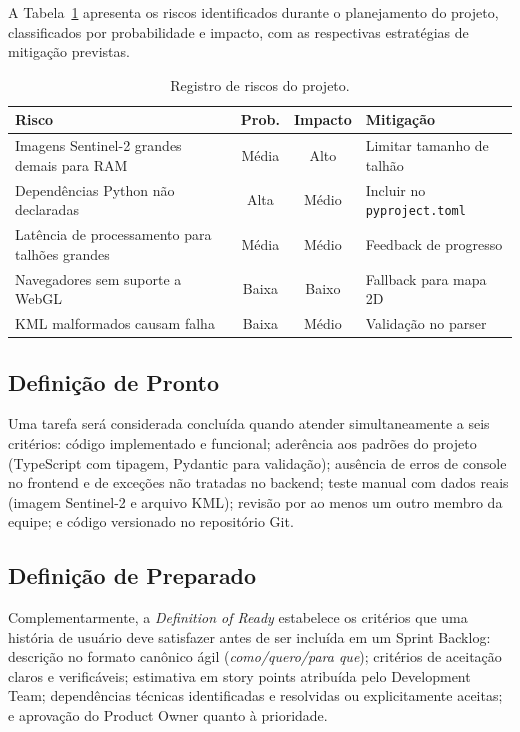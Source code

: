 \documentclass[12pt, a4paper]{article}
\begin{document}
A Tabela~\ref{tab:riscos} apresenta os riscos identificados durante o planejamento do projeto, classificados por probabilidade e impacto, com as respectivas estratégias de mitigação previstas.

\begin{table}[H]
\centering
\caption{Registro de riscos do projeto.}
\label{tab:riscos}
\footnotesize
\begin{tabularx}{\textwidth}{Xccl}
\toprule
\textbf{Risco} & \textbf{Prob.} & \textbf{Impacto} & \textbf{Mitigação} \\
\midrule
Imagens Sentinel-2 grandes demais para RAM & Média & Alto & Limitar tamanho de talhão \\
Dependências Python não declaradas & Alta & Médio & Incluir no \texttt{pyproject.toml} \\
Latência de processamento para talhões grandes & Média & Médio & Feedback de progresso \\
Navegadores sem suporte a WebGL & Baixa & Baixo & Fallback para mapa 2D \\
KML malformados causam falha & Baixa & Médio & Validação no parser \\
\bottomrule
\end{tabularx}
\end{table}

\subsection{Definição de Pronto}

Uma tarefa será considerada concluída quando atender simultaneamente a seis critérios: código implementado e funcional; aderência aos padrões do projeto (TypeScript com tipagem, Pydantic para validação); ausência de erros de console no frontend e de exceções não tratadas no backend; teste manual com dados reais (imagem Sentinel-2 e arquivo KML); revisão por ao menos um outro membro da equipe; e código versionado no repositório Git.

\subsection{Definição de Preparado}

Complementarmente, a \textit{Definition of Ready} estabelece os critérios que uma história de usuário deve satisfazer antes de ser incluída em um Sprint Backlog: descrição no formato canônico ágil (\textit{como/quero/para que}); critérios de aceitação claros e verificáveis; estimativa em story points atribuída pelo Development Team; dependências técnicas identificadas e resolvidas ou explicitamente aceitas; e aprovação do Product Owner quanto à prioridade.
\end{document}

